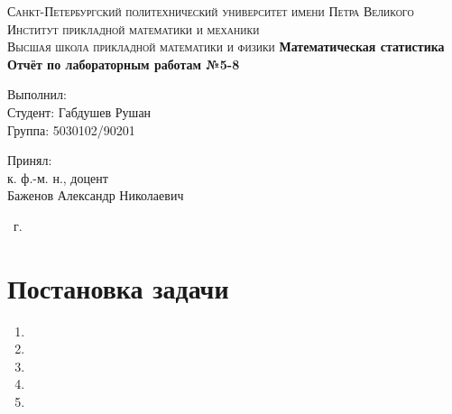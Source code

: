 \documentclass[14pt,a4paper,article]{ncc}
\begin{document}
\begin{titlepage}
    \begin{center}
        \textsc{
            Санкт-Петербургский политехнический университет имени Петра Великого \\[5mm]
            Институт прикладной математики и механики\\[2mm]
            Высшая школа прикладной математики и физики
        }
        \vfill
        \textbf{\large
            Математическая статистика\\
            Отчёт по лабораторным работам №5-8 \\[3mm]
        }
    \end{center}

    \vfill
    \hfill
    \begin{minipage}{0.5\textwidth}
        Выполнил: \\[2mm]
		Студент: Габдушев Рушан \\
		Группа: 5030102/90201\\
    \end{minipage}

	\hfill
	\begin{minipage}{0.5\textwidth}
		Принял: \\[2mm]
		к. ф.-м. н., доцент \\
		Баженов Александр Николаевич
	\end{minipage}

    \vfill
    \begin{center}
        \theyear\ г.
    \end{center}
\end{titlepage}

\tableofcontents
\newpage
\listoffigures
\newpage
\listoftables
\newpage

\section{Постановка задачи}
\label{sec:problem}
\begin{enumerate}
    \item %
    \item %
    \item
    \item
    \item
\end{enumerate}
\newpage
\end{document}
